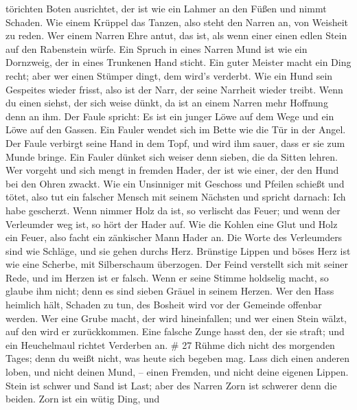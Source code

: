 törichten Boten ausrichtet, der ist wie ein Lahmer an den Füßen und
nimmt Schaden.  Wie einem Krüppel das Tanzen, also steht den
Narren an, von Weisheit zu reden.  Wer einem Narren Ehre
antut, das ist, als wenn einer einen edlen Stein auf den Rabenstein
würfe.  Ein Spruch in eines Narren Mund ist wie ein
Dornzweig, der in eines Trunkenen Hand sticht.  Ein guter
Meister macht ein Ding recht; aber wer einen Stümper dingt, dem wird's
verderbt.  Wie ein Hund sein Gespeites wieder frisst, also
ist der Narr, der seine Narrheit wieder treibt.  Wenn du
einen siehst, der sich weise dünkt, da ist an einem Narren mehr Hoffnung
denn an ihm.  Der Faule spricht: Es ist ein junger Löwe auf
dem Wege und ein Löwe auf den Gassen.  Ein Fauler wendet
sich im Bette wie die Tür in der Angel.  Der Faule verbirgt
seine Hand in dem Topf, und wird ihm sauer, dass er sie zum Munde
bringe.  Ein Fauler dünket sich weiser denn sieben, die da
Sitten lehren.  Wer vorgeht und sich mengt in fremden
Hader, der ist wie einer, der den Hund bei den Ohren zwackt.
 Wie ein Unsinniger mit Geschoss und Pfeilen schießt und
tötet,  also tut ein falscher Mensch mit seinem Nächsten
und spricht darnach: Ich habe gescherzt.  Wenn nimmer Holz
da ist, so verlischt das Feuer; und wenn der Verleumder weg ist, so hört
der Hader auf.  Wie die Kohlen eine Glut und Holz ein
Feuer, also facht ein zänkischer Mann Hader an.  Die Worte
des Verleumders sind wie Schläge, und sie gehen durchs Herz.
 Brünstige Lippen und böses Herz ist wie eine Scherbe, mit
Silberschaum überzogen.  Der Feind verstellt sich mit
seiner Rede, und im Herzen ist er falsch.  Wenn er seine
Stimme holdselig macht, so glaube ihm nicht; denn es sind sieben Gräuel
in seinem Herzen.  Wer den Hass heimlich hält, Schaden zu
tun, des Bosheit wird vor der Gemeinde offenbar werden. 
Wer eine Grube macht, der wird hineinfallen; und wer einen Stein wälzt,
auf den wird er zurückkommen.  Eine falsche Zunge hasst
den, der sie straft; und ein Heuchelmaul richtet Verderben an. \# 27
 Rühme dich nicht des morgenden Tages; denn du weißt nicht,
was heute sich begeben mag.  Lass dich einen anderen loben,
und nicht deinen Mund, -- einen Fremden, und nicht deine eigenen Lippen.
 Stein ist schwer und Sand ist Last; aber des Narren Zorn
ist schwerer denn die beiden.  Zorn ist ein wütig Ding, und
